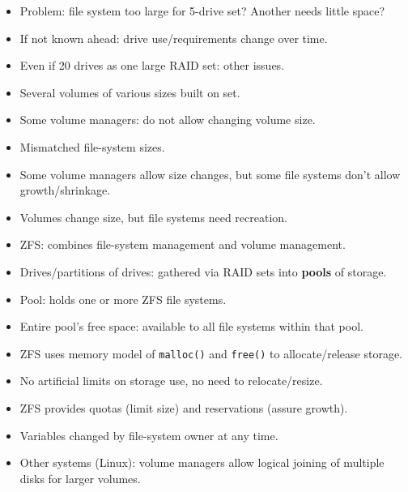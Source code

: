 \begin{itemize}
    \item Problem: file system too large for 5-drive set? Another needs little space?
    \item If not known ahead: drive use/requirements change over time.
    \item Even if 20 drives as one large RAID set: other issues.
    \item Several volumes of various sizes built on set.
    \item Some volume managers: do not allow changing volume size.
    \item Mismatched file-system sizes.
    \item Some volume managers allow size changes, but some file systems don't allow growth/shrinkage.
    \item Volumes change size, but file systems need recreation.
    \item ZFS: combines file-system management and volume management.
    \item Drives/partitions of drives: gathered via RAID sets into \textbf{pools} of storage.
    \item Pool: holds one or more ZFS file systems.
    \item Entire pool's free space: available to all file systems within that pool.
    \item ZFS uses memory model of \texttt{malloc()} and \texttt{free()} to allocate/release storage.
    \item No artificial limits on storage use, no need to relocate/resize.
    \item ZFS provides quotas (limit size) and reservations (assure growth).
    \item Variables changed by file-system owner at any time.
    \item Other systems (Linux): volume managers allow logical joining of multiple disks for larger volumes.
\end{itemize}

